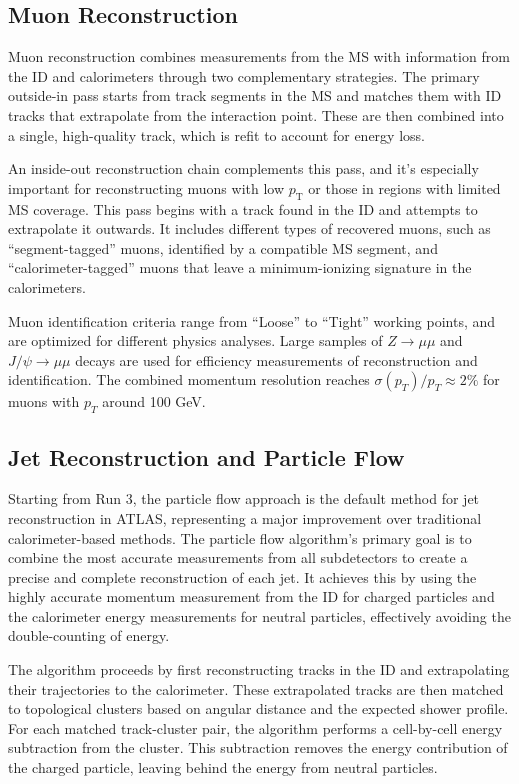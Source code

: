 \subsection{Muon Reconstruction}

Muon reconstruction combines measurements from the MS with information from the ID and calorimeters through two complementary strategies. The primary outside-in pass starts from track segments in the MS and matches them with ID tracks that extrapolate from the interaction point. These are then combined into a single, high-quality track, which is refit to account for energy loss.

An inside-out reconstruction chain complements this pass, and it's especially important for reconstructing muons with low $p_\text{T}$ or those in regions with limited MS coverage. This pass begins with a track found in the ID and attempts to extrapolate it outwards. It includes different types of recovered muons, such as ``segment-tagged'' muons, identified by a compatible MS segment, and ``calorimeter-tagged'' muons that leave a minimum-ionizing signature in the calorimeters.

Muon identification criteria range from ``Loose'' to ``Tight'' working points, and are optimized for different physics analyses. Large samples of $Z\to\mu\mu$ and $J/\psi\to\mu\mu$ decays are used for efficiency measurements of reconstruction and identification. The combined momentum resolution reaches $\sigma(p_T)/p_T \approx 2\%$ for muons with $p_T$ around 100 GeV.

\subsection{Jet Reconstruction and Particle Flow}

Starting from Run 3, the particle flow approach is the default method for jet reconstruction in ATLAS, representing a major improvement over traditional calorimeter-based methods. The particle flow algorithm's primary goal is to combine the most accurate measurements from all subdetectors to create a precise and complete reconstruction of each jet. It achieves this by using the highly accurate momentum measurement from the ID for charged particles and the calorimeter energy measurements for neutral particles, effectively avoiding the double-counting of energy.

The algorithm proceeds by first reconstructing tracks in the ID and extrapolating their trajectories to the calorimeter. These extrapolated tracks are then matched to topological clusters based on angular distance and the expected shower profile. For each matched track-cluster pair, the algorithm performs a cell-by-cell energy subtraction from the cluster. This subtraction removes the energy contribution of the charged particle, leaving behind the energy from neutral particles.

